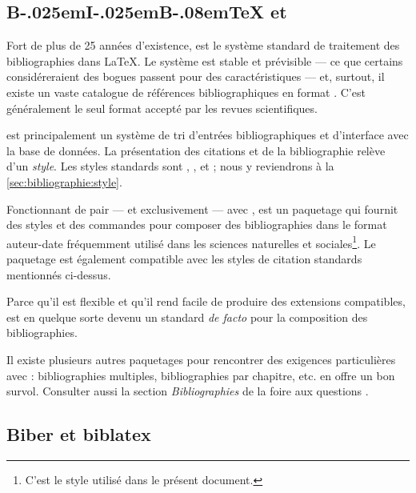 \subsection[{\BibTeX} et \pkg{natbib}]{%
  {B\kern-.025em{\small I}\kern-.025em{\small  B}\kern-.08em\TeX} %
  et }
\label{sec:bibliographie:systeme:bibtex}

Fort de plus de 25 années d'existence, {\BibTeX}
\citep{bibtex} est le système standard de traitement des
bibliographies dans {\LaTeX}. Le système est stable et prévisible ---
ce que certains considéreraient des bogues passent pour des
caractéristiques --- et, surtout, il existe un vaste catalogue de
références bibliographiques en format {\BibTeX}. C'est généralement le
seul format accepté par les revues scientifiques.

{\BibTeX} est principalement un système de tri d'entrées
bibliographiques et d'interface avec la base de données. La
présentation des citations et de la bibliographie relève d'un
\emph{style}. Les styles standards sont , ,
 et ; nous y reviendrons à la
\autoref{sec:bibliographie:style}.

Fonctionnant de pair --- et exclusivement --- avec {\BibTeX},
 \citep{natbib} est un paquetage qui fournit des styles et
des commandes pour composer des bibliographies dans le format
auteur-date fréquemment utilisé dans les sciences naturelles et
sociales\footnote{%
  C'est le style utilisé dans le présent document.}. %
Le paquetage est également compatible avec les styles de citation
standards mentionnés ci-dessus.

Parce qu'il est flexible et qu'il rend facile de produire des
extensions compatibles,  est en quelque sorte devenu un
standard \emph{de facto} pour la composition des bibliographies.

Il existe plusieurs autres paquetages pour rencontrer des exigences
particulières avec {\BibTeX}: bibliographies multiples, bibliographies
par chapitre, etc. \citet{Mori:bibliographies:2009} en offre un bon
survol. Consulter aussi la section \emph{Bibliographies} de la
foire aux questions %
.


\subsection{Biber et biblatex}
\label{sec:bibliographie:systeme:biblatex}

